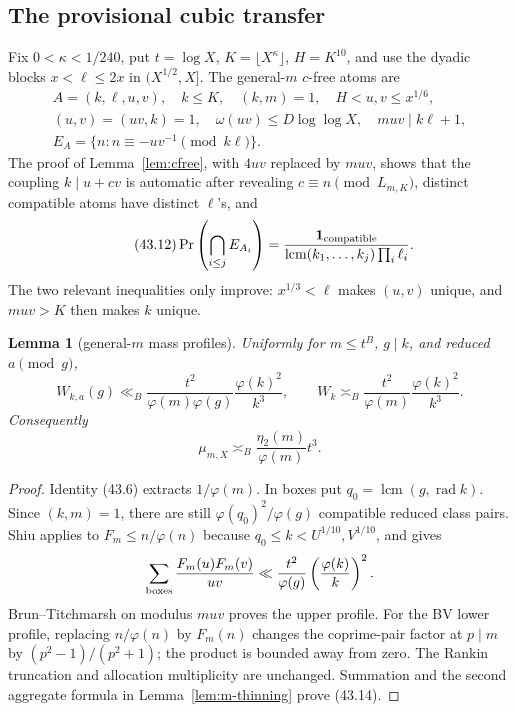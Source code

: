 \documentclass[10pt,reqno]{amsart}
\newtheorem{lemma}[theorem]{Lemma}
\theoremstyle{definition}
\newcommand{\rad}{\operatorname {rad}}
\newcommand{\lcm}{\operatorname {lcm}}
\newcommand{\1}{\mathbf 1}
\begin{document}
\subsection{The provisional cubic transfer}
Fix $0<\kappa<1/240$, put $t=\log X$, $K=\lfloor X^\kappa\rfloor$,
$H=K^{10}$, and use the dyadic blocks $x<\ell\leq2x$ in
$(X^{1/2},X]$.  The general-$m$ $c$-free atoms are
\begin{equation}\tag{43.11}
 \begin{gathered}
 A=(k,\ell,u,v),\quad k\leq K,\quad(k,m)=1,
 \quad H<u,v\leq x^{1/6},\\
 (u,v)=(uv,k)=1,
 \quad\omega(uv)\leq D\log\log X,
 \quad muv\mid k\ell+1,\\
 E_A=\{n:n\equiv-uv^{-1}\pmod{k\ell}\}.
 \end{gathered}
\end{equation}
The proof of Lemma~\ref{lem:cfree}, with $4uv$ replaced by $muv$, shows
that the coupling $k\mid u+cv$ is automatic after revealing
$c\equiv n\pmod{L_{m,K}}$, distinct compatible atoms have distinct
$\ell$'s, and
\begin{equation}\tag{43.12}
 \Pr\left(\bigcap_{i\leq j}E_{A_i}\right)
 =\frac{\mathbf1_{\rm compatible}}
 {\lcm(k_1,\ldots,k_j)\prod_i\ell_i}.
\end{equation}
The two relevant inequalities only improve: $x^{1/3}<\ell$ makes $(u,v)$
unique, and $muv>K$ then makes $k$ unique.

\begin{lemma}[general-$m$ mass profiles]\label{lem:m-profiles}
Uniformly for $m\leq t^B$, $g\mid k$, and reduced $a\pmod g$,
\begin{equation}\tag{43.13}
 W_{k,a}(g)\ll_B\frac{t^2}{\varphi(m)\varphi(g)}
                  \frac{\varphi(k)^2}{k^3},
 \qquad
 W_k\asymp_B\frac{t^2}{\varphi(m)}\frac{\varphi(k)^2}{k^3}.
\end{equation}
Consequently
\begin{equation}\tag{43.14}
 \mu_{m,X}\asymp_B\frac{\eta_2(m)}{\varphi(m)}t^3.
\end{equation}
\end{lemma}
\begin{proof}
Identity (43.6) extracts $1/\varphi(m)$.  In boxes put
$q_0=\lcm(g,\rad k)$.  Since $(k,m)=1$, there are still
$\varphi(q_0)^2/\varphi(g)$ compatible reduced class pairs.  Shiu applies
to $F_m\leq n/\varphi(n)$ because $q_0\leq k<U^{1/10},V^{1/10}$, and gives
\[
 \sum_{\rm boxes}\frac{F_m(u)F_m(v)}{uv}
 \ll\frac{t^2}{\varphi(g)}\left(\frac{\varphi(k)}k\right)^2.
\]
Brun--Titchmarsh on modulus $muv$ proves the upper profile.  For the BV
lower profile, replacing $n/\varphi(n)$ by $F_m(n)$ changes the coprime-pair
factor at $p\mid m$ by
$(p^2-1)/(p^2+1)$; the product is bounded away from zero.  The Rankin
truncation and allocation multiplicity are unchanged.  Summation and the
second aggregate formula in Lemma~\ref{lem:m-thinning} prove (43.14).
\end{proof}
\end{document}
